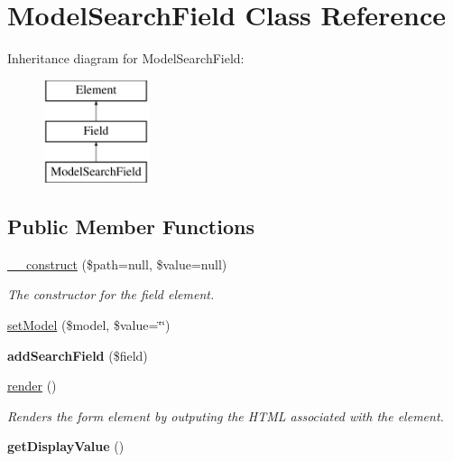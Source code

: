 \hypertarget{class_model_search_field}{
\section{ModelSearchField Class Reference}
\label{class_model_search_field}
}
Inheritance diagram for ModelSearchField:\begin{figure}[H]
\begin{center}
\leavevmode
\includegraphics[height=3.000000cm]{class_model_search_field}
\end{center}
\end{figure}
\subsection*{Public Member Functions}
\begin{DoxyCompactItemize}
\item 
\hypertarget{class_model_search_field_a0b0bd190b8215ed9389642d54630ecf9}{
\hyperlink{class_model_search_field_a0b0bd190b8215ed9389642d54630ecf9}{\_\-\_\-construct} (\$path=null, \$value=null)}
\label{class_model_search_field_a0b0bd190b8215ed9389642d54630ecf9}

\begin{DoxyCompactList}\small\item\em The constructor for the field element. \item\end{DoxyCompactList}\item 
\hyperlink{class_model_search_field_ac1a63b5380145f84a6e8c47b55793cbe}{setModel} (\$model, \$value=\char`\"{}\char`\"{})
\item 
\hypertarget{class_model_search_field_a57d9cd475cb3a556d00c7884f4bf1890}{
{\bfseries addSearchField} (\$field)}
\label{class_model_search_field_a57d9cd475cb3a556d00c7884f4bf1890}

\item 
\hyperlink{class_model_search_field_a17e4e7388114a58b8813b27839bafe8f}{render} ()
\begin{DoxyCompactList}\small\item\em Renders the form element by outputing the HTML associated with the element. \item\end{DoxyCompactList}\item 
\hypertarget{class_model_search_field_aa9984cae320bffd4fac9f94ad1dca668}{
{\bfseries getDisplayValue} ()}
\label{class_model_search_field_aa9984cae320bffd4fac9f94ad1dca668}

\end{DoxyCompactItemize}
